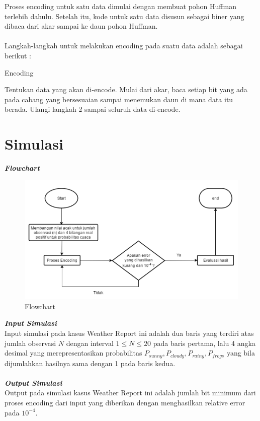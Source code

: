 \documentclass[journal]{IEEEtran}
\begin{document}
\vspace*{0.5cm}
\hspace*{0.3cm}Proses encoding untuk satu data dimulai dengan membuat pohon Huffman terlebih dahulu. Setelah itu, kode untuk satu data disusun sebagai biner yang dibaca dari akar sampai ke daun pohon Huffman.\\
\\
Langkah-langkah untuk melakukan encoding pada suatu data adalah sebagai berikut :
\begin{algorithm}[H]
	\caption{Encoding} \label{alg:encoding}
	\begin{algorithmic}[1]
		\State Tentukan data yang akan di-encode.
		\State Mulai dari akar, baca setiap bit yang ada pada cabang yang bersesuaian sampai menemukan daun di mana data itu berada.
		\State Ulangi langkah 2 sampai seluruh data di-encode.
	\end{algorithmic}
\end{algorithm}
\section{Simulasi}
\textbf{\textit{Flowchart}}\\
\begin{figure}[H]
		\centering
		\includegraphics[width=\linewidth]{Capture2.png}
		\caption{Flowchart}
		\label{fig:flowchart}
\end{figure}
\textbf{\textit{Input Simulasi}}\\
\hspace*{0.6cm}Input simulasi pada kasus Weather Report ini adalah dua baris yang terdiri atas jumlah observasi $N$ dengan interval $1 \leq N \leq 20$ pada baris pertama, lalu 4 angka desimal yang merepresentasikan probabilitas  $P_{sunny} , P_{cloudy} , P_{rainy} , P_{frogs}$ yang bila dijumlahkan hasilnya sama dengan 1 pada baris kedua.\\
\\
\hspace*{0.3cm}\textbf{\textit{Output Simulasi}}\\
\hspace*{0.6cm}Output pada simulasi kasus Weather Report ini adalah jumlah bit minimum dari proses encoding dari input yang diberikan dengan menghasilkan relative error pada $10^{-4}$. 
\end{document}
